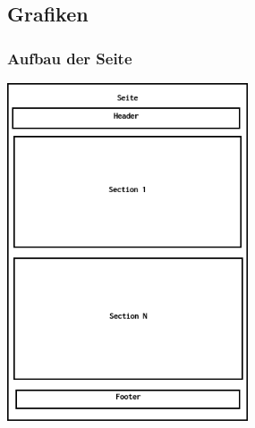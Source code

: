 \documentclass[11pt,a4paper]{article}
\begin{document}
\begin{appendices}

\begin{landscape}

\end{landscape}
\subsection{Grafiken}
\subsubsection{Aufbau der Seite}
\label{sec:epage}
\includegraphics[scale=0.5,height=10cm]{Seite}

\end{appendices}
\end{document}
